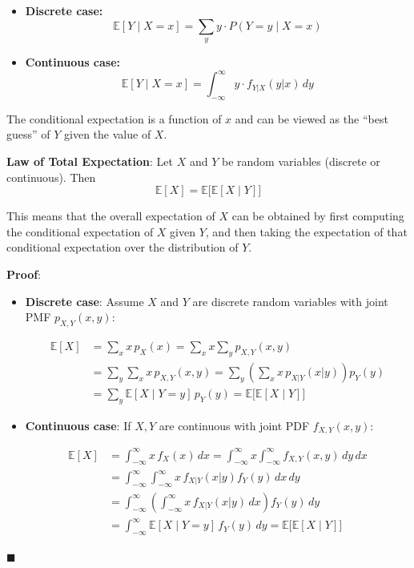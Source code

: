 \documentclass[twoside]{book}
\begin{document}
\begin{itemize}
    \item \textbf{Discrete case:}
    \[
    \mathbb{E}[Y \mid X = x] = \sum_y y \cdot P(Y = y \mid X = x)
    \]

    \item \textbf{Continuous case:}
    \[
    \mathbb{E}[Y \mid X = x] = \int_{-\infty}^{\infty} y \cdot f_{Y|X}(y|x) \, dy
    \]
\end{itemize}

The conditional expectation is a function of \( x \) and can be viewed as the ``best guess'' of \( Y \) given the value of \( X \).

\begin{textbox}
\textbf{Law of Total Expectation}: Let \(X\) and \(Y\) be random variables (discrete or continuous). Then
\[
\mathbb{E}[X] = \mathbb{E}\big[\mathbb{E}[X \mid Y]\big]
\]
\end{textbox}
This means that the overall expectation of \(X\) can be obtained by first computing the conditional expectation of \(X\) given \(Y\), and then taking the expectation of that conditional expectation over the distribution of \(Y\).

\textbf{Proof}:

\begin{itemize}
    \item \textbf{Discrete case}: Assume \(X\) and \(Y\) are discrete random variables with joint PMF \(p_{X,Y}(x,y)\):

\begin{align*}
\mathbb{E}[X] &= \sum_x x \, p_X(x) = \sum_x x \sum_y p_{X,Y}(x,y) \\
&= \sum_y \sum_x x \, p_{X,Y}(x,y) = \sum_y \left( \sum_x x \, p_{X|Y}(x|y) \right) p_Y(y) \\
&= \sum_y \mathbb{E}[X \mid Y = y] \, p_Y(y) = \mathbb{E}\big[\mathbb{E}[X \mid Y]\big]
\end{align*}
    \item \textbf{Continuous case}: If \(X, Y\) are continuous with joint PDF \(f_{X,Y}(x,y)\):

\begin{align*}
\mathbb{E}[X] &= \int_{-\infty}^{\infty} x \, f_X(x) \, dx = \int_{-\infty}^{\infty} x \int_{-\infty}^{\infty} f_{X,Y}(x,y) \, dy \, dx \\
&= \int_{-\infty}^{\infty} \int_{-\infty}^{\infty} x \, f_{X|Y}(x|y) f_Y(y) \, dx \, dy \\
&= \int_{-\infty}^{\infty} \left( \int_{-\infty}^{\infty} x \, f_{X|Y}(x|y) \, dx \right) f_Y(y) \, dy \\
&= \int_{-\infty}^{\infty} \mathbb{E}[X \mid Y = y] \, f_Y(y) \, dy = \mathbb{E}\big[\mathbb{E}[X \mid Y]\big]
\end{align*}
\end{itemize}
\hfill $\blacksquare$
\end{document}
